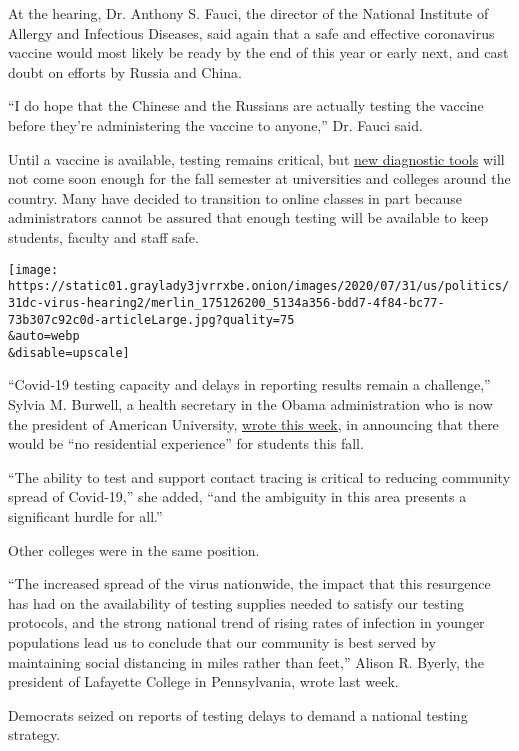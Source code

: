 At the hearing, Dr. Anthony S. Fauci, the director of the National
Institute of Allergy and Infectious Diseases, said again that a safe and
effective coronavirus vaccine would most likely be ready by the end of
this year or early next, and cast doubt on efforts by Russia and China.

``I do hope that the Chinese and the Russians are actually testing the
vaccine before they're administering the vaccine to anyone,'' Dr. Fauci
said.

Until a vaccine is available, testing remains critical, but
\href{https://www.nytimes3xbfgragh.onion/2020/07/06/health/fast-coronavirus-tests.html}{new
diagnostic tools} will not come soon enough for the fall semester at
universities and colleges around the country. Many have decided to
transition to online classes in part because administrators cannot be
assured that enough testing will be available to keep students, faculty
and staff safe.

\texttt{[image: https://static01.graylady3jvrrxbe.onion/images/2020/07/31/us/politics/31dc-virus-hearing2/merlin\_175126200\_5134a356-bdd7-4f84-bc77-73b307c92c0d-articleLarge.jpg?quality=75\\\&auto=webp\\\&disable=upscale]}

``Covid-19 testing capacity and delays in reporting results remain a
challenge,'' Sylvia M. Burwell, a health secretary in the Obama
administration who is now the president of American University,
\href{https://www.american.edu/president/announcements/july-30-2020.cfm}{wrote
this week}, in announcing that there would be ``no residential
experience'' for students this fall.

``The ability to test and support contact tracing is critical to
reducing community spread of Covid-19,'' she added, ``and the ambiguity
in this area presents a significant hurdle for all.''

Other colleges were in the same position.

``The increased spread of the virus nationwide, the impact that this
resurgence has had on the availability of testing supplies needed to
satisfy our testing protocols, and the strong national trend of rising
rates of infection in younger populations lead us to conclude that our
community is best served by maintaining social distancing in miles
rather than feet,'' Alison R. Byerly, the president of Lafayette College
in Pennsylvania, wrote last week.

Democrats seized on reports of testing delays to demand a national
testing strategy.

